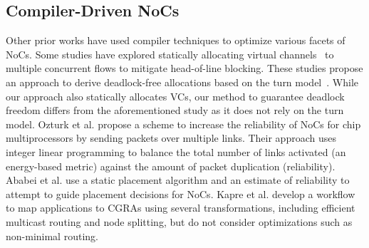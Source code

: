 \subsection{Compiler-Driven NoCs}
Other prior works have used compiler techniques to optimize various facets of NoCs.
Some studies have explored statically allocating virtual channels~\cite{staticVC-isca, staticVC-nocs} to multiple concurrent flows to mitigate head-of-line blocking. These studies propose an approach to derive deadlock-free allocations based on the turn model~\cite{turnModel}. While our approach also statically allocates VCs, our method to guarantee deadlock freedom differs from the aforementioned study as it does not rely on the turn model.
Ozturk et al. \cite{ozturk2010compiler} propose a scheme to increase the reliability of NoCs for chip multiprocessors by sending packets over multiple links.
Their approach uses integer linear programming to balance the total number of links activated (an energy-based metric) against the amount of packet duplication (reliability).
Ababei et al. \cite{ababei2011energy} use a static placement algorithm and an estimate of reliability to attempt to guide placement decisions for NoCs.
Kapre et al. \cite{kapre2011noc} develop a workflow to map applications to CGRAs using several transformations, including efficient multicast routing and node splitting, but do not consider optimizations such as non-minimal routing.






